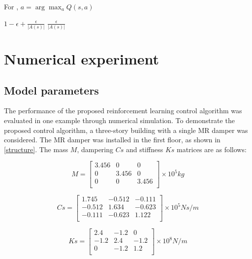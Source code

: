 For ,
$a=\arg \max _{a} Q(s, a)$

$1- \epsilon + \frac{\epsilon}{|A(s)|}$
$\frac{\epsilon}{|A(s)|}$

\section{Numerical experiment}
\subsection{Model parameters}
The performance of the proposed reinforcement learning control algorithm was evaluated in one example through numerical simulation. To demonstrate the proposed control algorithm, a three-story building with a single MR damper was considered. The MR damper was installed in the first floor, as shown in \ref{structure}. The mass $M$, dampering $Cs$ and stiffness $Ks$ matrices are as follows:

\begin{equation}       
M=\left[                 
  \begin{array}{ccc}   
   3.456 & 0 & 0 \\  
    0 & 3.456 & 0 \\ 
   0 & 0 &  3.456 \\
  \end{array}
\right]     
\times 10^{5} kg        
\end{equation}

\begin{equation}       
Cs=\left[                 
  \begin{array}{ccc}   
    1.745 & -0.512 & -0.111\\
    -0.512 & 1.634 & -0.623 \\
    -0.111 & -0.623 & 1.122 \\
  \end{array}
\right]     
\times 10^{5} N s/m        
\end{equation}

\begin{equation}       
Ks=\left[                 
  \begin{array}{ccc}   
  2.4 & -1.2 & 0 \\
  -1.2 & 2.4 & -1.2 \\
  0 & -1.2 & 1.2 \\
  \end{array}
\right]     
\times 10^{8} N/m        
\end{equation}

